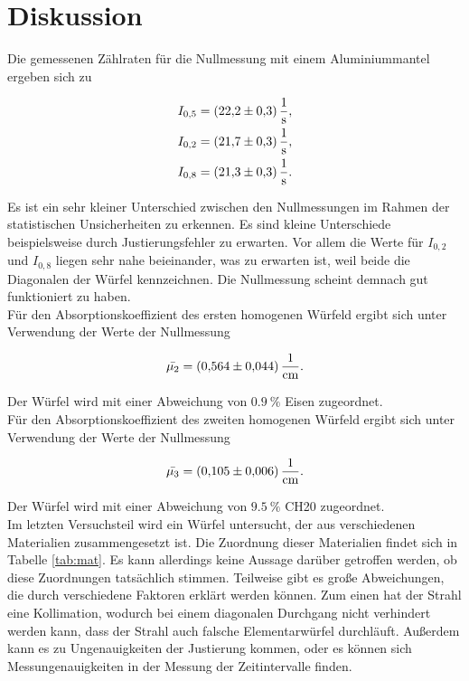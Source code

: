 \section{Diskussion}
\label{sec:Diskussion}

Die gemessenen Zählraten für die Nullmessung mit einem Aluminiummantel ergeben sich zu 

\vspace{-25pt}
\begin{align*}
    I_{0,5} &= \SI{22.2+-0.3}{\per\second},\\ 
    I_{0,2} &= \SI{21.7+-0.3}{\per\second},\\ 
    I_{0,8} &= \SI{21.3+-0.3}{\per\second}.   
\end{align*}

Es ist ein sehr kleiner Unterschied zwischen den Nullmessungen im Rahmen der statistischen Unsicherheiten zu erkennen. 
Es sind kleine Unterschiede beispielsweise durch Justierungsfehler zu erwarten. Vor allem 
die Werte für $I_{0,2}$ und $I_{0,8}$ liegen sehr nahe beieinander, was zu erwarten ist, weil beide die Diagonalen der Würfel kennzeichnen. 
Die Nullmessung scheint demnach gut funktioniert zu haben.\\

Für den Absorptionskoeffizient des ersten homogenen Würfeld ergibt sich unter Verwendung der Werte der Nullmessung 

\vspace{-5pt}
\begin{equation*}
    \bar{\mu_2} = \SI{0.564+-0.044}{\per\centi\metre}. 
\end{equation*}

Der Würfel wird mit einer Abweichung von $\SI{0.9}{\percent}$ Eisen zugeordnet.\\

Für den Absorptionskoeffizient des zweiten homogenen Würfeld ergibt sich unter Verwendung der Werte der Nullmessung 

\vspace{-5pt}
\begin{equation*}
    \bar{\mu_3} = \SI{0.105+-0.006}{\per\centi\metre}. 
\end{equation*}

Der Würfel wird mit einer Abweichung von $\SI{9.5}{\percent}$ CH20 zugeordnet.\\

Im letzten Versuchsteil wird ein Würfel untersucht, der aus verschiedenen Materialien zusammengesetzt ist. Die Zuordnung 
dieser Materialien findet sich in Tabelle \ref{tab:mat}. Es kann allerdings keine Aussage darüber getroffen werden, ob diese
Zuordnungen tatsächlich stimmen. Teilweise gibt es große Abweichungen, die durch verschiedene Faktoren erklärt werden können. 
Zum einen hat der Strahl eine Kollimation, wodurch bei einem diagonalen Durchgang nicht verhindert werden kann, dass 
der Strahl auch falsche Elementarwürfel durchläuft. Außerdem kann es zu Ungenauigkeiten der Justierung kommen, oder es können
sich Messungenauigkeiten in der Messung der Zeitintervalle finden. 

